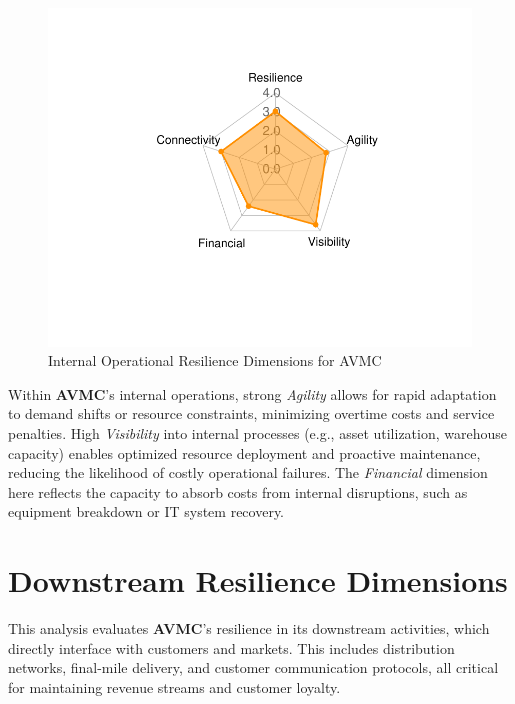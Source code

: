 \documentclass[
  oneside,
  open=any,
  fontsize=11pt]{scrbook}
\begin{document}
\begin{figure}[H]

{\centering \includegraphics[width=0.8\linewidth,height=\textheight,keepaspectratio]{example_3_files/figure-pdf/internal-radar-chart-1.pdf}

}

\caption{Internal Operational Resilience Dimensions for AVMC}

\end{figure}%

Within \textbf{AVMC}'s internal operations, strong \emph{Agility} allows
for rapid adaptation to demand shifts or resource constraints,
minimizing overtime costs and service penalties. High \emph{Visibility}
into internal processes (e.g., asset utilization, warehouse capacity)
enables optimized resource deployment and proactive maintenance,
reducing the likelihood of costly operational failures. The
\emph{Financial} dimension here reflects the capacity to absorb costs
from internal disruptions, such as equipment breakdown or IT system
recovery.

\section{Downstream Resilience
Dimensions}\label{downstream-resilience-dimensions}

This analysis evaluates \textbf{AVMC}'s resilience in its downstream
activities, which directly interface with customers and markets. This
includes distribution networks, final-mile delivery, and customer
communication protocols, all critical for maintaining revenue streams
and customer loyalty.
\end{document}
